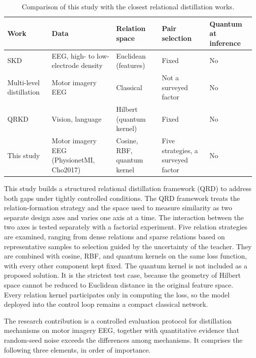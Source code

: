\begin{table}[!htbp]
\centering
\caption{Comparison of this study with the closest relational distillation works.}
\label{tab:sosanhcongtrinh}
\small
\begin{tabular}{>{\raggedright\arraybackslash}p{3.0cm}>{\raggedright\arraybackslash}p{2.8cm}>{\raggedright\arraybackslash}p{2.6cm}>{\raggedright\arraybackslash}p{2.8cm}>{\raggedright\arraybackslash}p{1.9cm}}
\toprule
\textbf{Work} & \textbf{Data} & \textbf{Relation space} & \textbf{Pair selection} & \textbf{Quantum at inference} \\
\midrule
SKD \cite{huang2024enhancing} & EEG, high- to low-electrode density & Euclidean (features) & Fixed & No \\
Multi-level distillation \cite{wu2026multilevel} & Motor imagery EEG & Classical & Not a surveyed factor & No \\
QRKD \cite{liu2025quantum} & Vision, language & Hilbert (quantum kernel) & Fixed & No \\
This study & Motor imagery EEG (PhysionetMI, Cho2017) & Cosine, RBF, quantum kernel & Five strategies, a surveyed factor & No \\
\bottomrule
\end{tabular}
\end{table}

This study builds a structured relational distillation framework (QRD) to
address both gaps under tightly controlled conditions. The QRD framework
treats the relation-formation strategy and the space used to measure
similarity as two separate design axes and varies one axis at a time.
The interaction between the two axes is tested separately with a factorial experiment.
Five relation strategies are examined, ranging from dense relations and
sparse relations based on representative samples to selection guided by
the uncertainty of the teacher. They are combined with cosine, RBF, and
quantum kernels on the same loss function, with every other component kept
fixed. The quantum kernel
is not included as a proposed solution. It is the strictest test case,
because the geometry of Hilbert space cannot be reduced to Euclidean
distance in the original feature space. Every relation kernel
participates only in computing the loss, so the model deployed into the
control loop remains a compact classical network.

The research contribution is a controlled evaluation protocol for
distillation mechanisms on motor imagery EEG, together with quantitative
evidence that random-seed noise exceeds the differences among mechanisms.
It comprises the following three elements, in order of importance.

